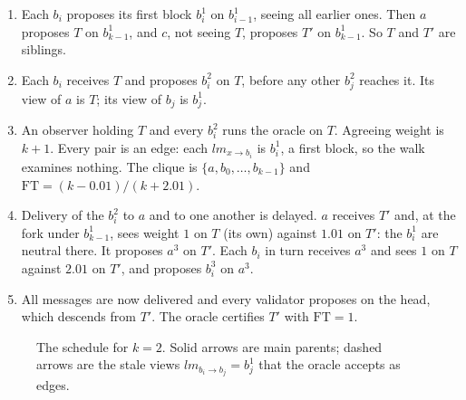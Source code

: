 \documentclass[11pt]{article}
\theoremstyle{definition}
\theoremstyle{remark}
\begin{document}
\begin{enumerate}[leftmargin=1.5em]
\item Each $b_i$ proposes its first block $b_i^1$ on $b_{i-1}^1$, seeing all
  earlier ones. Then $a$ proposes $T$ on $b_{k-1}^1$, and $c$, not seeing $T$,
  proposes $T'$ on $b_{k-1}^1$. So $T$ and $T'$ are siblings.
\item Each $b_i$ receives $T$ and proposes $b_i^2$ on $T$, before any other
  $b_j^2$ reaches it. Its view of $a$ is $T$; its view of $b_j$ is $b_j^1$.
\item An observer holding $T$ and every $b_i^2$ runs the oracle on $T$.
  Agreeing weight is $k+1$. Every pair is an edge: each $\mathit{lm}_{x\to b_i}$
  is $b_i^1$, a first block, so the walk examines nothing. The clique is
  $\{a,b_0,\dots,b_{k-1}\}$ and $\mathrm{FT}=(k-0.01)/(k+2.01)$.
\item Delivery of the $b_i^2$ to $a$ and to one another is delayed. $a$
  receives $T'$ and, at the fork under $b_{k-1}^1$, sees weight $1$ on $T$
  (its own) against $1.01$ on $T'$: the $b_i^1$ are neutral there. It proposes
  $a^3$ on $T'$. Each $b_i$ in turn receives $a^3$ and sees $1$ on $T$ against
  $2.01$ on $T'$, and proposes $b_i^3$ on $a^3$.
\item All messages are now delivered and every validator proposes on the
  head, which descends from $T'$. The oracle certifies $T'$ with
  $\mathrm{FT}=1$.
\end{enumerate}

\begin{figure}[ht]
\centering
{}
\caption{The schedule for $k=2$. Solid arrows are main parents; dashed arrows
are the stale views $\mathit{lm}_{b_i\to b_j}=b_j^1$ that the oracle accepts as
edges.}
\label{fig:counter}
\end{figure}
\end{document}
